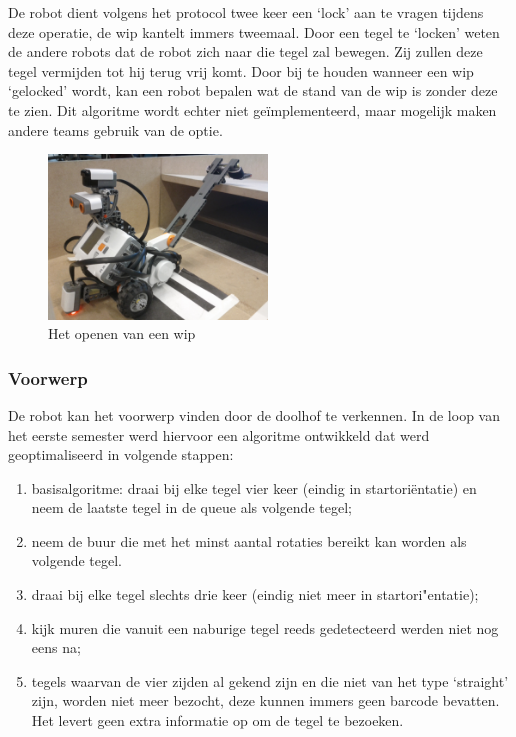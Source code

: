 \documentclass[eind]{penoverslag}
\begin{document}
De robot dient volgens het protocol twee keer een `lock' aan te vragen tijdens deze operatie, de wip kantelt immers tweemaal. 
Door een tegel te `locken' weten de andere robots dat de robot zich naar die tegel zal bewegen. Zij zullen deze tegel vermijden tot hij terug vrij komt. Door bij te houden wanneer een wip `gelocked' wordt, kan een robot bepalen wat de stand van de wip is zonder deze te zien. Dit algoritme wordt echter niet ge\"implementeerd, maar mogelijk maken andere teams gebruik van de optie.

\begin{figure}[hb!]
	\centering
	\includegraphics[width=0.52\textwidth]{robotWip}
	\caption{Het openen van een wip}
	\label{fig:robotWip}
\end{figure}


\subsubsection{Voorwerp} %
\label{sssec:AlgoZoek}
De robot kan het voorwerp vinden door de doolhof te verkennen. In de loop van het eerste semester werd hiervoor een algoritme ontwikkeld dat werd geoptimaliseerd in volgende stappen: 

\begin{enumerate}
\item basisalgoritme: draai bij elke tegel vier keer (eindig in startori\"entatie) en neem de laatste tegel in de queue als volgende tegel;
\item neem de buur die met het minst aantal rotaties bereikt kan worden als volgende tegel.
\item draai bij elke tegel slechts drie keer (eindig niet meer in startori"entatie);
\item kijk muren die vanuit een naburige tegel reeds gedetecteerd werden niet nog eens na;
\item tegels waarvan de vier zijden al gekend zijn en die niet van het type `straight' zijn, worden niet meer bezocht, deze kunnen immers geen barcode bevatten. Het levert geen extra informatie op om de tegel te bezoeken.
\end{enumerate}
\end{document}
